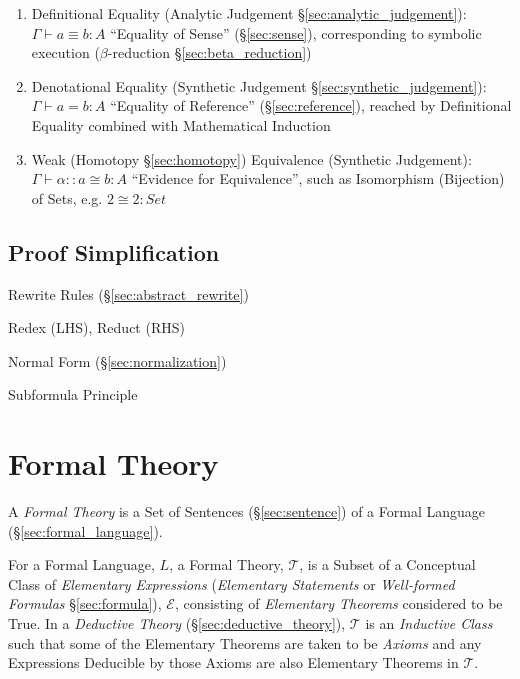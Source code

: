 \begin{enumerate}
  \item Definitional Equality (Analytic Judgement
    \S\ref{sec:analytic_judgement}): $\Gamma \vdash a \equiv b : A$
    ``Equality of Sense'' (\S\ref{sec:sense}), corresponding to
    symbolic execution ($\beta$-reduction \S\ref{sec:beta_reduction})
  \item Denotational Equality (Synthetic Judgement
    \S\ref{sec:synthetic_judgement}): $\Gamma \vdash a = b : A$
    ``Equality of Reference'' (\S\ref{sec:reference}), reached by
    Definitional Equality combined with Mathematical Induction
  \item Weak (Homotopy \S\ref{sec:homotopy}) Equivalence (Synthetic
    Judgement): $\Gamma \vdash \alpha :: a \cong b : A$ ``Evidence for
    Equivalence'', such as Isomorphism (Bijection) of Sets, e.g. $2
    \cong 2 : Set$
\end{enumerate}



\subsection{Proof Simplification}\label{sec:proof_simplification}

Rewrite Rules (\S\ref{sec:abstract_rewrite})

Redex (LHS), Reduct (RHS)

Normal Form (\S\ref{sec:normalization})

Subformula Principle



\section{Formal Theory}\label{sec:formal_theory}

A \emph{Formal Theory} is a Set of Sentences (\S\ref{sec:sentence}) of
a Formal Language (\S\ref{sec:formal_language}).

For a Formal Language, $L$, a Formal Theory, $\mathcal{T}$, is a
Subset of a Conceptual Class of \emph{Elementary Expressions}
(\emph{Elementary Statements} or \emph{Well-formed Formulas}
\S\ref{sec:formula}), $\mathcal{E}$, consisting of \emph{Elementary
  Theorems} considered to be True. In a \emph{Deductive Theory}
(\S\ref{sec:deductive_theory}), $\mathcal{T}$ is an \emph{Inductive
  Class} such that some of the Elementary Theorems are taken to be
\emph{Axioms} and any Expressions Deducible by those Axioms are also
Elementary Theorems in $\mathcal{T}$.

